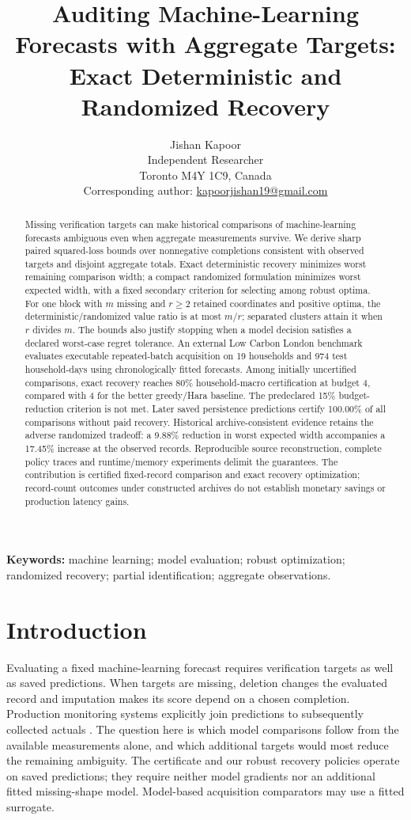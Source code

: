 \documentclass[12pt]{article}
\title{Auditing Machine-Learning Forecasts with Aggregate Targets: Exact Deterministic and Randomized Recovery}
\author{Jishan Kapoor\\
Independent Researcher\\
Toronto M4Y 1C9, Canada\\
Corresponding author: \href{mailto:kapoorjishan19@gmail.com}{kapoorjishan19@gmail.com}}
\date{}
\begin{document}
\maketitle

\begin{abstract}
Missing verification targets can make historical comparisons of machine-learning forecasts ambiguous even when aggregate measurements survive. We derive sharp paired squared-loss bounds over nonnegative completions consistent with observed targets and disjoint aggregate totals. Exact deterministic recovery minimizes worst remaining comparison width; a compact randomized formulation minimizes worst expected width, with a fixed secondary criterion for selecting among robust optima. For one block with $m$ missing and $r\geq2$ retained coordinates and positive optima, the deterministic/randomized value ratio is at most $m/r$; separated clusters attain it when $r$ divides $m$. The bounds also justify stopping when a model decision satisfies a declared worst-case regret tolerance. An external Low Carbon London benchmark evaluates executable repeated-batch acquisition on 19 households and 974 test household-days using chronologically fitted forecasts. Among initially uncertified comparisons, exact recovery reaches 80\% household-macro certification at budget 4, compared with 4 for the better greedy/Hara baseline. The predeclared 15\% budget-reduction criterion is not met. Later saved persistence predictions certify 100.00\% of all comparisons without paid recovery. Historical archive-consistent evidence retains the adverse randomized tradeoff: a 9.88\% reduction in worst expected width accompanies a 17.45\% increase at the observed records. Reproducible source reconstruction, complete policy traces and runtime/memory experiments delimit the guarantees. The contribution is certified fixed-record comparison and exact recovery optimization; record-count outcomes under constructed archives do not establish monetary savings or production latency gains.
\end{abstract}
\noindent\textbf{Keywords:} machine learning; model evaluation; robust optimization;
randomized recovery; partial identification; aggregate observations.

\section{Introduction}
Evaluating a fixed machine-learning forecast requires verification targets
as well as saved predictions. When targets are missing, deletion changes
the evaluated record and imputation makes its score depend on a chosen
completion. Production monitoring systems explicitly join predictions to
subsequently collected actuals \cite{azuremonitor,awsmonitor}. The question
here is which model comparisons follow from the available measurements
alone, and which additional targets would most reduce the remaining ambiguity.
The certificate and our robust recovery policies operate on saved predictions;
they require neither model gradients nor an additional fitted missing-shape
model. Model-based acquisition comparators may use a fitted surrogate.
\end{document}
